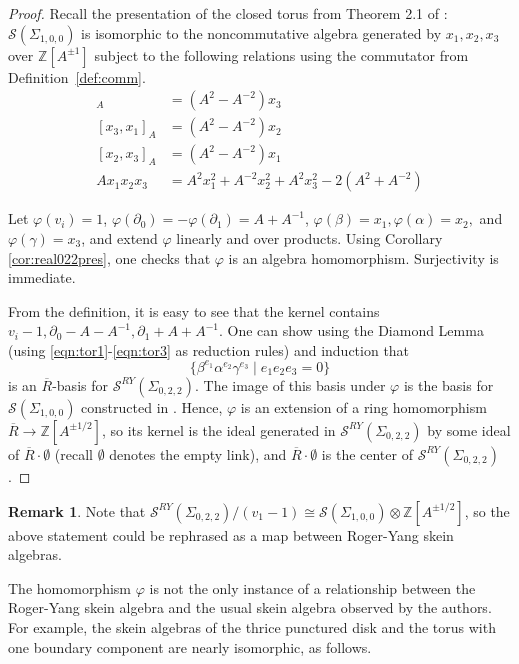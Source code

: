 \documentclass{article}
\newcommand{\del}{\partial}
\newcommand{\Z}{\mathbb{Z}}
\renewcommand{\phi}{\varphi}
\renewcommand{\a}{\alpha}
\renewcommand{\b}{\beta}
\newcommand{\g}{\gamma}
\renewcommand{\S}{\mathcal{S}}
\newcommand{\SRY}{\mathcal{S}^{RY}}
\newcommand{\san}{\Sigma_{0,2,2}}
\newcommand{\sto}{\Sigma_{1,0,0}}
\theoremstyle{definition}
\newtheorem{remark}[theorem]{Remark}
\renewcommand{\g}{\gamma}
\renewcommand{\a}{\alpha}
\renewcommand{\b}{\beta}
\renewcommand{\san}{\Sigma_{0, 2, 2}}
\renewcommand{\SRY}{\ensuremath{ \mathcal S^{RY}}}
\begin{document}
\begin{proof}




Recall the presentation of the closed torus from Theorem 2.1 of  \cite{BullockPrz}:     $\mathcal{S}(\Sigma_{1,0,0})$ is isomorphic to the noncommutative algebra generated by $x_1,x_2,x_3$ over $\Z[A^{\pm 1}]$ subject to the following relations using the commutator from Definition~\ref{def:comm}.
    \begin{align*}
        [x_1,x_2]_A&=(A^2-A^{-2})x_3\\
        [x_3,x_1]_A&=(A^2-A^{-2})x_2\\
        [x_2,x_3]_A&=(A^2-A^{-2})x_1\\
        Ax_1x_2x_3&=A^2x_1^2+A^{-2}x_2^2+A^2x_3^2-2(A^2+A^{-2})
    \end{align*}






    Let $\phi(v_i)=1$, $\phi(\del_0)=-\phi(\del_1)=A+A^{-1}$, $\phi(\b)=x_1, \phi(\a)=x_2,$ and $\phi(\g)=x_3$, and extend $\phi$ linearly and over products. Using Corollary \ref{cor:real022pres}, one checks that $\phi$ is an algebra homomorphism. Surjectivity is immediate. 


From the definition, it is easy to see that the kernel contains $v_i-1,\del_0-A-A^{-1},\del_1+A+A^{-1}$.   One can show using the Diamond Lemma (using \eqref{eqn:tor1}-\eqref{eqn:tor3} as reduction rules) and induction that 
\[
\{\b^{e_1}\a^{e_2}\g^{e_3}\mid e_1e_2e_3=0\}
\]
is an $\overline{R}$-basis for $\SRY(\san)$. The image of this basis under $\phi$ is the basis for $\S(\sto)$ constructed in \cite[Thm.~2.1]{BullockPrz}. Hence, $\phi$ is an extension of a ring homomorphism $\overline{R}\to \Z[A^{\pm1/2}]$, so its kernel is the ideal generated in $\SRY(\san)$ by some ideal of $\overline{R}\cdot \emptyset$ (recall $\emptyset$ denotes the empty link), and $\overline{R}\cdot \emptyset$ is the center of $\SRY(\san)$.
\end{proof}


\begin{remark}

Note that $\SRY(\san)/(v_1-1)\cong \mathcal{S}(\sto)\otimes \Z[A^{\pm 1/2}]$, so the above statement could be rephrased as a map between Roger-Yang skein algebras.  

\end{remark}


The homomorphism $\phi$ is not the only instance of a relationship between the Roger-Yang skein algebra and the usual skein algebra observed by the authors. For example, the skein algebras of the thrice punctured disk and the torus with one boundary component are nearly isomorphic, as follows.
\end{document}
